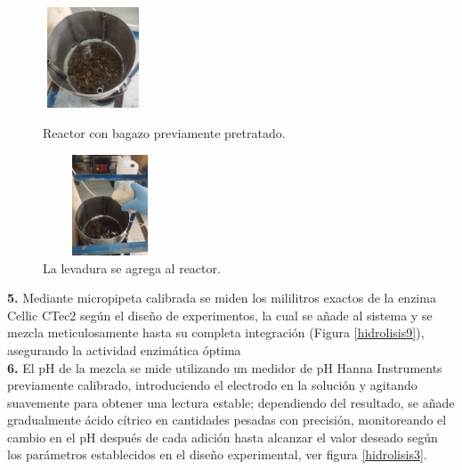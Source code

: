 \documentclass[12pt]{article}
\begin{document}
	      
	     \begin{figure}[H]
	     	\centering
	     	\begin{minipage}{0.46\textwidth}
	     		\centering
	     		\includegraphics[width=3cm, height=3cm]{imagenes/hidrolisis1} %
	     		\caption{ Reactor con bagazo previamente pretratado.}
	     		\label{ hidrolisis}
	     	\end{minipage}
	     	\hfill
	     	\begin{minipage}{0.48\textwidth}
	     		\centering
	     		\includegraphics[width=4cm, height=3cm]{imagenes/hidrolisis4 } %
	     		\caption{La levadura se agrega al reactor.}
	     		\label{hidrolisis4}
	     	\end{minipage}
	     \end{figure}
	     
	     
	     \textbf{5.} Mediante micropipeta calibrada se miden los mililitros exactos de la enzima Cellic CTec2 según el diseño de experimentos, la cual se añade al sistema y se mezcla meticulosamente hasta su completa integración (Figura \ref{hidrolisis9}), asegurando la actividad enzimática óptima	\\ 
	     	
	     	 
	     \textbf{6.} El pH de la mezcla se mide utilizando un medidor de pH Hanna Instruments previamente calibrado, introduciendo el electrodo en la solución y agitando suavemente para obtener una lectura estable; dependiendo del resultado, se añade gradualmente ácido cítrico en cantidades pesadas con precisión, monitoreando el cambio en el pH después de cada adición hasta alcanzar el valor deseado según los parámetros establecidos en el diseño experimental, ver figura \ref{hidrolisis3}.
	     
	     
	     
\end{document}
